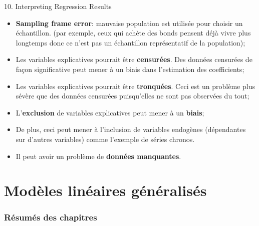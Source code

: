 \documentclass[12pt, titlepage, french]{report}
\begin{document}
\begin{CHPT_SUMM}{10. Interpreting Regression Results}
\begin{enumerate}
	\begin{itemize}
		\item	\textbf{Sampling frame error}: mauvaise population est utilisée pour choisir un échantillon. (par exemple, ceux qui achète des bonds pensent déjà vivre plus longtemps donc ce n'est pas un échantillon représentatif de la population);
		\item	Les variables explicatives pourrait être \textbf{censurées}. Des données censurées de façon significative peut mener à un biais dans l'estimation des coefficients;
		\item	Les variables explicatives pourrait être \textbf{tronquées}. Ceci est un problème plus sévère que des données censurées puisqu'elles ne sont pas observées du tout;
		\item	L'\textbf{exclusion} de variables explicatives peut mener à un \textbf{biais};
		\item[]	De plus, ceci peut mener à l'inclusion de variables endogènes (dépendantes sur d'autres variables) comme l'exemple de séries chronos.
		\item	Il peut avoir un problème de \textbf{données manquantes}.
	\end{itemize}
\end{enumerate}
\end{CHPT_SUMM}

\section{Modèles linéaires généralisés}

\subsubsection{Résumés des chapitres}
\end{document}
